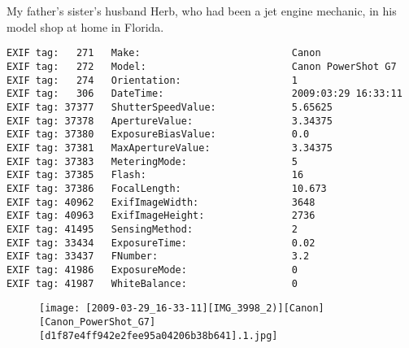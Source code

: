\section{\protect{}}
\noindent My father's sister's husband Herb, who had been a jet engine mechanic, in his model shop at home in Florida.
\noindent
\begin{lstlisting}
EXIF tag:   271   Make:                          Canon
EXIF tag:   272   Model:                         Canon PowerShot G7
EXIF tag:   274   Orientation:                   1
EXIF tag:   306   DateTime:                      2009:03:29 16:33:11
EXIF tag: 37377   ShutterSpeedValue:             5.65625
EXIF tag: 37378   ApertureValue:                 3.34375
EXIF tag: 37380   ExposureBiasValue:             0.0
EXIF tag: 37381   MaxApertureValue:              3.34375
EXIF tag: 37383   MeteringMode:                  5
EXIF tag: 37385   Flash:                         16
EXIF tag: 37386   FocalLength:                   10.673
EXIF tag: 40962   ExifImageWidth:                3648
EXIF tag: 40963   ExifImageHeight:               2736
EXIF tag: 41495   SensingMethod:                 2
EXIF tag: 33434   ExposureTime:                  0.02
EXIF tag: 33437   FNumber:                       3.2
EXIF tag: 41986   ExposureMode:                  0
EXIF tag: 41987   WhiteBalance:                  0

\end{lstlisting}
\clearpage
\begin{figure}
\raggedleft
\texttt{[image: [2009-03-29\_16-33-11][IMG\_3998\_2)][Canon][Canon\_PowerShot\_G7][d1f87e4ff942e2fee95a04206b38b641].1.jpg]}
\end{figure}


\clearpage
